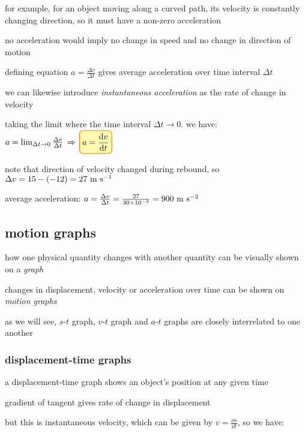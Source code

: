 for example, for an object moving along a curved path, its velocity is constantly changing direction, so it must have a non-zero acceleration

no acceleration would imply no change in speed and no change in direction of motion

\cmt defining equation $a = \frac{\Delta v}{\Delta t}$ gives average acceleration over time interval $\Delta t$

we can likewise introduce \emph{instantaneous acceleration} as the rate of change in velocity

taking the limit where the time interval $\Delta t \to 0$. we have: $a = \lim_{\Delta t \to 0} \frac{\Delta v}{\Delta t} \ra \boxed{a=\frac{\dd v}{\dd t}} $


\sol note that direction of velocity changed during rebound, so $\Delta v = 15 - (-12) = 27 \text{ m s$^{-1}$}$

average acceleration: $a = \frac{\Delta v}{\Delta t} = \frac{27}{30 \times 10^{-3}} = 900 \text{ m s$^{-2}$}$ \eoe



\subsection{motion graphs}

how one physical quantity changes with another quantity can be visually shown on a \emph{graph}

changes in displacement, velocity or acceleration over time can be shown on \emph{motion graphs}

as we will see, $s$-$t$ graph, $v$-$t$ graph and $a$-$t$ graphs are closely interrelated to one another

\subsubsection{displacement-time graphs}

a displacement-time graph shows an object's position at any given time

\cmt gradient of tangent gives rate of change in displacement

but this is instantaneous velocity, which can be given by $v = \frac{\dd s}{\dd t}$, so we have:

